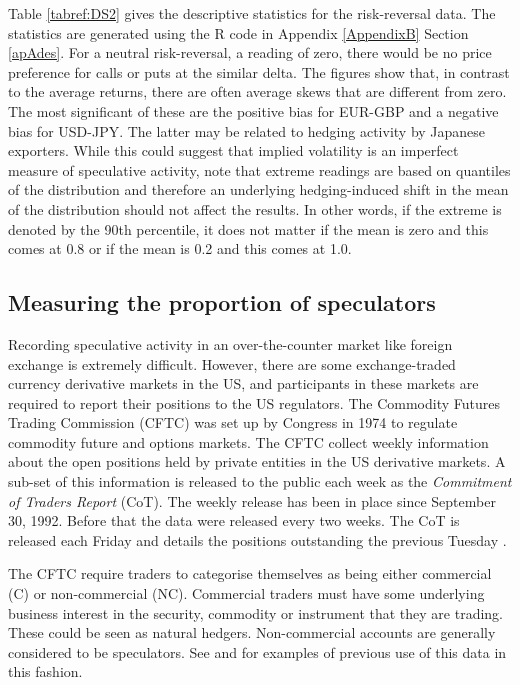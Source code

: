 \documentclass[12pt, a4paper, oneside]{article} %
\begin{document}
Table \ref{tabref:DS2} gives the descriptive statistics for the risk-reversal data.  The statistics are generated using the R code in Appendix \ref{AppendixB} Section \ref{apAdes}.  For a neutral risk-reversal, a reading of zero, there would be no price preference for calls or puts at the similar delta.  The figures show that, in contrast to the average returns, there are often average skews that are different from zero.  The most significant of these are the positive bias for EUR-GBP and a negative bias for USD-JPY.  The latter may be related to hedging activity by Japanese exporters.  While this could suggest that implied volatility is an imperfect measure of speculative activity, note that extreme readings are based on quantiles of the distribution and therefore an underlying hedging-induced shift in the mean of the distribution should not affect the results.  In other words, if the extreme is denoted by the 90th percentile, it does not matter if the mean is zero and this comes at 0.8 or if the mean is 0.2 and this comes at 1.0.  

\subsection{Measuring the proportion of speculators}
Recording speculative activity in an over-the-counter market like foreign exchange is extremely difficult.  However, there are some exchange-traded currency derivative markets in the US, and participants in these markets are required to report their positions to the US regulators.  The Commodity Futures Trading Commission (CFTC) was set up by Congress in 1974 to regulate commodity future and options markets. The CFTC collect weekly information about the open positions held by private entities in the US derivative markets.   A sub-set of this information is released to the public each week as the \emph{Commitment of Traders Report} (CoT).  The weekly release has been in place since September 30, 1992.  Before that the data were released every two weeks.  The CoT is released each Friday and details the positions outstanding the previous Tuesday \citep{cot}.

The CFTC require traders to categorise themselves as being either commercial (C) or non-commercial (NC).  Commercial traders must have some underlying business interest in the security, commodity or instrument that they are trading.  These could be seen as natural hedgers.  Non-commercial accounts are generally considered to be speculators.  See \citep{FuturesSanders} and \citep{FuturesWang} for examples of previous use of this data in this fashion. 
 
\end{document}
